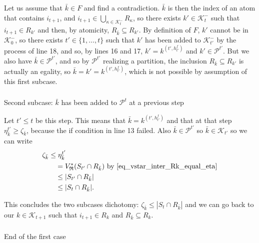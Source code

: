 \documentclass[
  11pt,
  a4paper,
]{article}
\makeatletter
\let\oldsubparagraph\subparagraph
\renewcommand{\subparagraph}{
    \@ifstar
      \xxxSubParagraphStar
      \xxxSubParagraphNoStar
  }
\newcommand{\xxxSubParagraphStar}[1]{\oldsubparagraph*{#1}\mbox{}}
\newcommand{\xxxSubParagraphNoStar}[1]{\oldsubparagraph{#1}\mbox{}}
\theoremstyle{plain}
\theoremstyle{definition}
\theoremstyle{plain}
\theoremstyle{definition}
\theoremstyle{plain}
\theoremstyle{remark}
\makeatother
\begin{document}
Let us assume that \(\bar k\in F\) and find a contradiction. \(\bar k\)
is then the index of an atom that contains \(i_{t+1}\), and
\(i_{t+1}\in\bigcup_{\kappa\in\mathcal{K}^-_{t}}R_{\kappa}\), so there
exists \(k'\in\mathcal{K}^-_{t}\) such that \(i_{t+1}\in R_{k'}\) and
then, by atomicity, \(R_{\bar k}\subseteq R_{k'}\). By definition of
\(F\), \(k'\) cannot be in \(\mathcal{K}_0^-\), so there exists
\(t'\in\{1,\dotsc,t\}\) such that \(k'\) has been added to
\(\mathcal{K}^-_{t'}\) by the process of line 18, and so, by lines 16
and 17, \(k'=k^{(t',h^f_{t'})}\) and \(k'\in\mathcal{P}^{t'}\). But we
also have \(\bar k\in\mathcal{P}^{t'}\), and so by \(\mathcal{P}^{t'}\)
realizing a partition, the inclusion \(R_{\bar k}\subseteq R_{k'}\) is
actually an egality, so \(\bar k = k' = k^{(t',h^f_{t'})}\), which is
not possible by assumption of this first subcase.

\subparagraph{\texorpdfstring{Second subcase: \(\bar k\) has been added
to \(\mathcal{P}^t\) at a previous
step}{Second subcase: \textbackslash bar k has been added to \textbackslash mathcal\{P\}\^{}t at a previous step}}\label{second-subcase-bar-k-has-been-added-to-mathcalpt-at-a-previous-step}

Let \(t'\leq t\) be this step. This means that
\(\bar k = k^{(t',h^f_{t'})}\) and that at that step
\(\eta^{t'}_{\bar k}\geq \zeta_{\bar k}\), because the if condition in
line 13 failed. Also \(\bar k\in \mathcal{P}^{t'}\) so
\(\bar k\in \mathcal{K}_{t'}\) so we can write \begin{align*}
\zeta_{\bar k}&\leq\eta^{t'}_{\bar k}\\
&\quad=V^*_{\mathfrak{R}}(S_{t'}\cap R_{\bar k})  \text{ by~\eqref{eq_vstar_inter_Rk_equal_eta}} \\
&\quad\leq | S_{t'}\cap R_{\bar k} |\\
&\quad\leq  | S_{t}\cap R_{\bar k} |.\\
\end{align*}

This concludes the two subcases dichotomy:
\(\zeta_{\bar k}\leq |S_t\cap R_{\bar k}|\) and we can go back to our
\(k\in\mathcal{K}_{t+1}\) such that \(i_{t+1}\in R_k\) and
\(R_{\bar k}\subseteq R_k\).

\subparagraph{End of the first case}\label{end-of-the-first-case}
\end{document}
